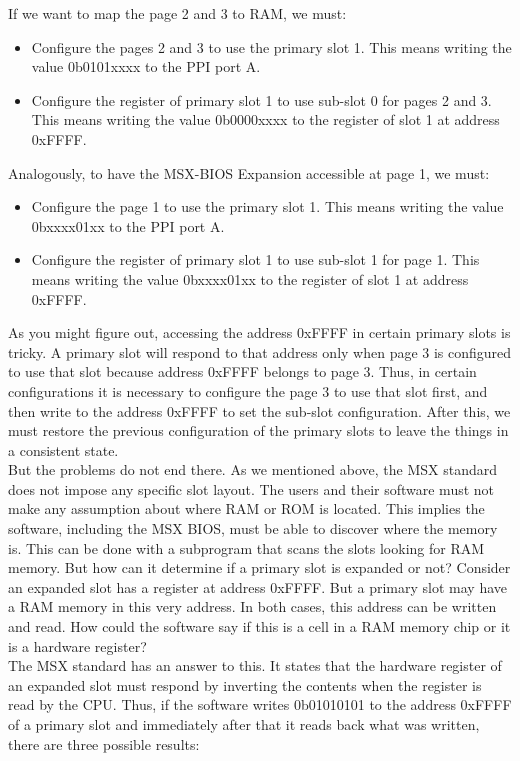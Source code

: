If we want to map the page 2 and 3 to RAM, we must:
\begin{itemize}
	\item Configure the pages 2 and 3 to use the primary slot 1. This means writing the value 0b0101xxxx to the PPI port A.
	\item Configure the register of primary slot 1 to use sub-slot 0 for pages 2 and 3. This means writing the value 0b0000xxxx to the register of slot 1 at address 0xFFFF.
\end{itemize}

Analogously, to have the MSX-BIOS Expansion accessible at page 1, we must:

\begin{itemize}
	\item Configure the page 1 to use the primary slot 1. This means writing the value 0bxxxx01xx to the PPI port A.
	\item Configure the register of primary slot 1 to use sub-slot 1 for page 1. This means writing the value 0bxxxx01xx to the register of slot 1 at address 0xFFFF.
\end{itemize}

As you might figure out, accessing the address 0xFFFF in certain primary slots is tricky. A primary slot will respond to that address only when page 3 is configured to use that slot because address 0xFFFF belongs to page 3. Thus, in certain configurations it is necessary to configure the page 3 to use that slot first, and then write to the address 0xFFFF to set the sub-slot configuration. After this, we must restore the previous configuration of the primary slots to leave the things in a consistent state. \\

But the problems do not end there. As we mentioned above, the MSX standard does not impose any specific slot layout. The users and their software must not make any assumption about where RAM or ROM is located. This implies the software, including the MSX BIOS, must be able to discover where the memory is. This can be done with a subprogram that scans the slots looking for RAM memory. But how can it determine if a primary slot is expanded or not? Consider an expanded slot has a register at address 0xFFFF. But a primary slot may have a RAM memory in this very address. In both cases, this address can be written and read. How could the software say if this is a cell in a RAM memory chip or it is a hardware register?\\

The MSX standard has an answer to this. It states that the hardware register of an expanded slot must respond by inverting the contents when the register is read by the CPU. Thus, if the software writes 0b01010101 to the address 0xFFFF of a primary slot and immediately after that it reads back what was written, there are three possible results:

